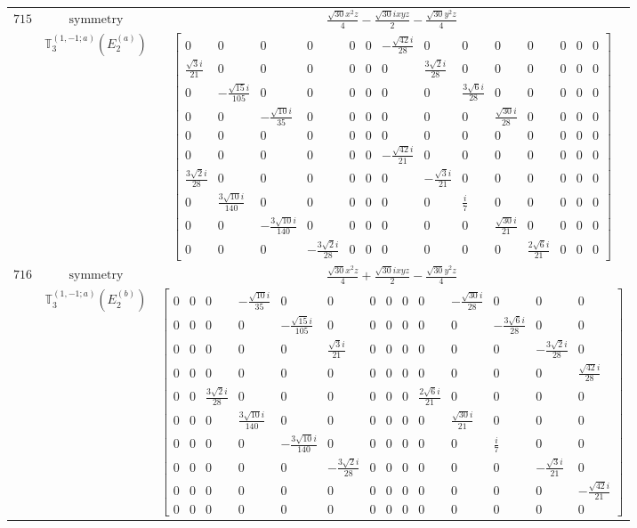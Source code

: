 \documentclass[fleqn,8pt,landscape]{jsarticle}
\begin{document}
\begin{longtable}{ccc}
$ 715 $ & $ \text{symmetry} $ & $ \frac{\sqrt{30} x^{2} z}{4} - \frac{\sqrt{30} i x y z}{2} - \frac{\sqrt{30} y^{2} z}{4} $ \\
$  $ & $ \mathbb{T}_{3}^{(1,-1;a)}(E_{2}^{(a)}) $ & $ \begin{bmatrix} 0 & 0 & 0 & 0 & 0 & 0 & - \frac{\sqrt{42} i}{28} & 0 & 0 & 0 & 0 & 0 & 0 & 0 \\ \frac{\sqrt{3} i}{21} & 0 & 0 & 0 & 0 & 0 & 0 & \frac{3 \sqrt{2} i}{28} & 0 & 0 & 0 & 0 & 0 & 0 \\ 0 & - \frac{\sqrt{15} i}{105} & 0 & 0 & 0 & 0 & 0 & 0 & \frac{3 \sqrt{6} i}{28} & 0 & 0 & 0 & 0 & 0 \\ 0 & 0 & - \frac{\sqrt{10} i}{35} & 0 & 0 & 0 & 0 & 0 & 0 & \frac{\sqrt{30} i}{28} & 0 & 0 & 0 & 0 \\ 0 & 0 & 0 & 0 & 0 & 0 & 0 & 0 & 0 & 0 & 0 & 0 & 0 & 0 \\ 0 & 0 & 0 & 0 & 0 & 0 & - \frac{\sqrt{42} i}{21} & 0 & 0 & 0 & 0 & 0 & 0 & 0 \\ \frac{3 \sqrt{2} i}{28} & 0 & 0 & 0 & 0 & 0 & 0 & - \frac{\sqrt{3} i}{21} & 0 & 0 & 0 & 0 & 0 & 0 \\ 0 & \frac{3 \sqrt{10} i}{140} & 0 & 0 & 0 & 0 & 0 & 0 & \frac{i}{7} & 0 & 0 & 0 & 0 & 0 \\ 0 & 0 & - \frac{3 \sqrt{10} i}{140} & 0 & 0 & 0 & 0 & 0 & 0 & \frac{\sqrt{30} i}{21} & 0 & 0 & 0 & 0 \\ 0 & 0 & 0 & - \frac{3 \sqrt{2} i}{28} & 0 & 0 & 0 & 0 & 0 & 0 & \frac{2 \sqrt{6} i}{21} & 0 & 0 & 0 \end{bmatrix} $ \\ \hline
$ 716 $ & $ \text{symmetry} $ & $ \frac{\sqrt{30} x^{2} z}{4} + \frac{\sqrt{30} i x y z}{2} - \frac{\sqrt{30} y^{2} z}{4} $ \\
$  $ & $ \mathbb{T}_{3}^{(1,-1;a)}(E_{2}^{(b)}) $ & $ \begin{bmatrix} 0 & 0 & 0 & - \frac{\sqrt{10} i}{35} & 0 & 0 & 0 & 0 & 0 & 0 & - \frac{\sqrt{30} i}{28} & 0 & 0 & 0 \\ 0 & 0 & 0 & 0 & - \frac{\sqrt{15} i}{105} & 0 & 0 & 0 & 0 & 0 & 0 & - \frac{3 \sqrt{6} i}{28} & 0 & 0 \\ 0 & 0 & 0 & 0 & 0 & \frac{\sqrt{3} i}{21} & 0 & 0 & 0 & 0 & 0 & 0 & - \frac{3 \sqrt{2} i}{28} & 0 \\ 0 & 0 & 0 & 0 & 0 & 0 & 0 & 0 & 0 & 0 & 0 & 0 & 0 & \frac{\sqrt{42} i}{28} \\ 0 & 0 & \frac{3 \sqrt{2} i}{28} & 0 & 0 & 0 & 0 & 0 & 0 & \frac{2 \sqrt{6} i}{21} & 0 & 0 & 0 & 0 \\ 0 & 0 & 0 & \frac{3 \sqrt{10} i}{140} & 0 & 0 & 0 & 0 & 0 & 0 & \frac{\sqrt{30} i}{21} & 0 & 0 & 0 \\ 0 & 0 & 0 & 0 & - \frac{3 \sqrt{10} i}{140} & 0 & 0 & 0 & 0 & 0 & 0 & \frac{i}{7} & 0 & 0 \\ 0 & 0 & 0 & 0 & 0 & - \frac{3 \sqrt{2} i}{28} & 0 & 0 & 0 & 0 & 0 & 0 & - \frac{\sqrt{3} i}{21} & 0 \\ 0 & 0 & 0 & 0 & 0 & 0 & 0 & 0 & 0 & 0 & 0 & 0 & 0 & - \frac{\sqrt{42} i}{21} \\ 0 & 0 & 0 & 0 & 0 & 0 & 0 & 0 & 0 & 0 & 0 & 0 & 0 & 0 \end{bmatrix} $ \\ \hline

\end{longtable}
\end{document}
